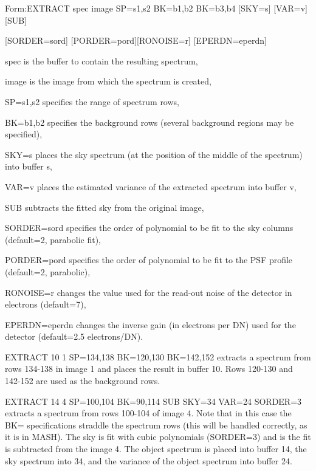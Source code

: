 {\newpage\clearpage
{}%
\begin{command}
  \item[Form:EXTRACT spec image SP=s1,s2 BK=b1,b2 BK=b3,b4 {[SKY=s]} 
       {[VAR=v]} {[SUB]}\hfill]{}
  \item[{[SORDER=sord]} {[PORDER=pord]}{[RONOISE=r]} 
        {[EPERDN=eperdn]} \hfill]{}
  \item[spec\hfill]{is the buffer to contain the resulting spectrum,}
  \item[image\hfill]{is the image from which the spectrum is created,}
  \item[SP=s1,s2\hfill]{specifies the range of spectrum rows,}
  \item[BK=b1,b2\hfill]{specifies the background rows (several background
       regions may be specified),}
  \item[SKY=s\hfill]{places the sky spectrum (at the position of the
       middle of the spectrum) into buffer s,}
  \item[VAR=v\hfill]{places the estimated variance of the extracted
       spectrum into buffer v,}
  \item[SUB\hfill]{subtracts the fitted sky from the original image,}
  \item[SORDER=sord\hfill]{specifies the order of polynomial to be fit to the
       sky columns (default=2, parabolic fit),}
  \item[PORDER=pord\hfill]{specifies the order of polynomial to be fit to the
       PSF profile (default=2, parabolic),}
  \item[RONOISE=r\hfill]{changes the value used for the read-out noise of the
       detector in electrons (default=7),}
  \item[EPERDN=eperdn\hfill]{changes the inverse gain (in electrons per DN) 
       used for the detector (default=2.5 electrons/DN).}
\end{command}%
\lthtmlfigureZ
\lthtmlcheckvsize\clearpage}

{\newpage\clearpage
{}%
\begin{example}
  \item[EXTRACT 10 1 SP=134,138 BK=120,130 BK=142,152\hfill]{ extracts a
       spectrum from rows 134-138 in image 1 and places the result in
       buffer 10.  Rows 120-130 and 142-152 are used as the background
       rows.}
\par
\item[EXTRACT 14 4 SP=100,104 BK=90,114 SUB SKY=34 VAR=24
       SORDER=3\hfill]{ extracts a spectrum from rows 100-104 of image 4.
       Note that in this case the BK= specifications straddle the spectrum
       rows (this will be handled correctly, as it is in MASH).  The sky is
       fit with cubic polynomials (SORDER=3) and is the fit is subtracted
       from the image 4.  The object spectrum is placed into buffer 14, the
       sky spectrum into 34, and the variance of the object spectrum into
       buffer 24.}
\end{example}%
\lthtmlfigureZ
\lthtmlcheckvsize\clearpage}

